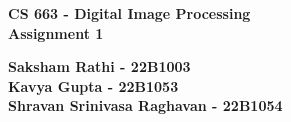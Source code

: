 \documentclass{article}
\begin{document}
\begin{titlepage}
\centering
\vspace{5cm}

\textbf{\Huge CS 663 - Digital Image Processing} \\
\vspace{0.5cm}
\textbf{\Large Assignment 1} \\
\vspace{10cm}


\textbf{\Large Saksham Rathi - 22B1003}\\
\vspace{0.2cm}
\textbf{\Large Kavya Gupta - 22B1053}\\
\vspace{0.2cm}
\textbf{\Large Shravan Srinivasa Raghavan - 22B1054}\\
\vspace{0.2cm}
\vspace{5cm}

\end{titlepage}
\end{document}
